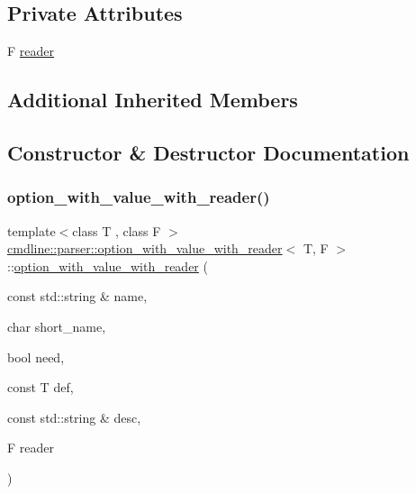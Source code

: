 \subsection*{Private Attributes}
\begin{DoxyCompactItemize}
\item 
F \mbox{\hyperlink{classcmdline_1_1parser_1_1option__with__value__with__reader_a1d06ee0129f99751c6461b7fe3dc844b}{reader}}
\end{DoxyCompactItemize}
\subsection*{Additional Inherited Members}


\subsection{Constructor \& Destructor Documentation}
\mbox{\label{classcmdline_1_1parser_1_1option__with__value__with__reader_a408c571b8600e58520f8600f84070527}} 
\subsubsection{\texorpdfstring{option\_with\_value\_with\_reader()}{option\_with\_value\_with\_reader()}}
{\footnotesize\ttfamily template$<$class T , class F $>$ \\
\mbox{\hyperlink{classcmdline_1_1parser_1_1option__with__value__with__reader}{cmdline\+::parser\+::option\+\_\+with\+\_\+value\+\_\+with\+\_\+reader}}$<$ T, F $>$\+::\mbox{\hyperlink{classcmdline_1_1parser_1_1option__with__value__with__reader}{option\+\_\+with\+\_\+value\+\_\+with\+\_\+reader}} (\begin{DoxyParamCaption}\item[{const std\+::string \&}]{name,  }\item[{char}]{short\+\_\+name,  }\item[{bool}]{need,  }\item[{const T}]{def,  }\item[{const std\+::string \&}]{desc,  }\item[{F}]{reader }\end{DoxyParamCaption})\hspace{0.3cm}{\ttfamily [inline]}}



